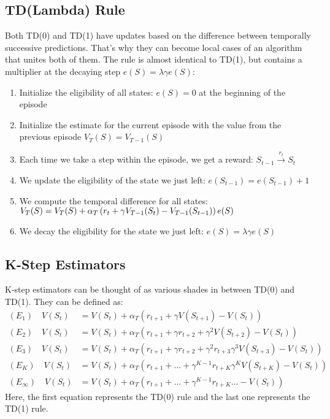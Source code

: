 \documentclass{article}
\begin{document}
\subsection{TD(Lambda) Rule}
Both TD(0) and TD(1) have updates based on the difference between temporally successive predictions. That's why they can become local cases of an algorithm that unites both of them. The rule is almost identical to TD(1), but contains a multiplier at the decaying step $e(S) = \lambda \gamma e(S)$:
\begin{enumerate}
  \item Initialize the eligibility of all states: $e(S) = 0$ at the beginning of the episode
  \item Initialize the estimate for the current episode with the value from the previous episode $V_T(S) = V_{T - 1}(S)$
  \item Each time we take a step within the episode, we get a reward: $S_{t - 1} \xrightarrow{r_t} S_t$
  \item We update the eligibility of the state we just left: $e(S_{t - 1}) = e(S_{t - 1}) + 1$
  \item We compute the temporal difference for all states: $V_T(S) = V_T(S) + \newline \alpha_T \left( r_t + \gamma V_{T - 1}(S_t) - V_{T - 1}(S_{t - 1}) \right) e(S)$
  \item We decay the eligibility for the state we just left: $e(S) = \lambda \gamma e(S)$
\end{enumerate}
\subsection{K-Step Estimators}
K-step estimators can be thought of as various shades in between TD(0) and TD(1). They can be defined as:
\begin{align*}
  (E_1) \quad V(S_t) &= V(S_t) + \alpha_T \left( r_{t + 1} + \gamma V(S_{t + 1}) - V(S_t) \right) \\
  (E_2) \quad V(S_t) &= V(S_t) + \alpha_T \left( r_{t + 1} + \gamma r_{t + 2} + \gamma^2 V(S_{t + 2}) - V(S_t) \right) \\
  (E_3) \quad V(S_t) &= V(S_t) + \alpha_T \left( r_{t + 1} + \gamma r_{t + 2} + \gamma^2 r_{t + 3} \gamma^3 V(S_{t + 3}) - V(S_t) \right) \\
  (E_K) \quad V(S_t) &= V(S_t) + \alpha_T \left( r_{t + 1} + \ldots + \gamma^{K - 1} r_{t + K} \gamma^K V(S_{t + K}) - V(S_t) \right) \\
  (E_{\infty}) \quad V(S_t) &= V(S_t) + \alpha_T \left( r_{t + 1} + \ldots + \gamma^{K - 1} r_{t + K} \ldots - V(S_t) \right)
\end{align*}
Here, the first equation represents the TD(0) rule and the last one represents the TD(1) rule.
\end{document}

